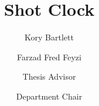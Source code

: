 \documentclass{scu-thesis}
\author{Kory Bartlett}
\author{Farzad Fred Feyzi}
\title{Shot Clock}
\begin{document}
\frontmatter
\signature{Thesis Advisor}
\signature{Department Chair}

\maketitle


\tableofcontents
\listoffigures

\mainmatter












\backmatter
\end{document}
